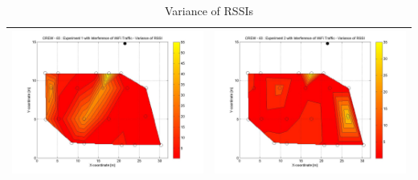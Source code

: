 \documentclass[11pt,a4paper,headinclude,footinclude,chapterprefix=on]{scrreprt}
\begin{document}
\begin{table}
	[h] \centering \caption{Variance of RSSIs} 
	\label{tb:63:Wifi:variance} 
	\begin{tabular}
		{|l|l|} \hline 
		\includegraphics[width=8cm]{../../Source/plot/CREW_63/63_Wifi_Ex_1_Variance.jpg} & 		\includegraphics[width=8cm]{../../Source/plot/CREW_63/63_Wifi_Ex_2_Variance.jpg} \\
		\hline
	\end{tabular}
\end{table}
\pagebreak 
\end{document}

